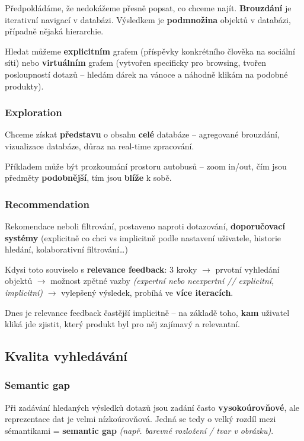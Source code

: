 Předpokládáme, že nedokážeme přesně popsat, co chceme najít. \textbf{Brouzdání} je iterativní navigací v databázi. Výsledkem je \textbf{podmnožina} objektů v databázi, případně nějaká hierarchie.

Hledat můžeme \textbf{explicitním} grafem (příspěvky konkrétního člověka na sociální síti) nebo \textbf{virtuálním} grafem (vytvořen specificky pro browsing, tvořen posloupností dotazů -- hledám dárek na vánoce a náhodně klikám na podobné produkty).

\subsubsection{Exploration}

Chceme získat \textbf{představu} o obsahu \textbf{celé} databáze -- agregované brouzdání, vizualizace databáze, důraz na real-time zpracování.

Příkladem může být prozkoumání prostoru autobusů -- zoom in/out, čím jsou předměty \textbf{podobnější}, tím jsou \textbf{blíže} k sobě.

\subsubsection{Recommendation}

Rekomendace neboli filtrování, postaveno naproti dotazování, \textbf{doporučovací systémy} (explicitně co chci vs implicitně podle nastavení uživatele, historie hledání, kolaborativní filtrování\ldots)

Kdysi toto souviselo s \textbf{relevance feedback}: 3 kroky $\to$ prvotní vyhledání objektů $\to$ možnost zpětné vazby \textit{(expertní nebo neexpertní // explicitní, implicitní)} $\to$ vylepšený výsledek, probíhá ve \textbf{více iteracích}.

Dnes je relevance feedback častější implicitně -- na základě toho, \textbf{kam} uživatel kliká jde zjistit, který produkt byl pro něj zajímavý a relevantní.

\subsection{Kvalita vyhledávání}

\subsubsection{Semantic gap}

Při zadávání hledaných výsledků dotazů jsou zadání často \textbf{vysokoúrovňové}, ale reprezentace dat je velmi nízkoúrovňová. Jedná se tedy o velký rozdíl mezi sémantikami = \textbf{semantic gap} \textit{(např. barevné rozložení / tvar v obrázku)}.

